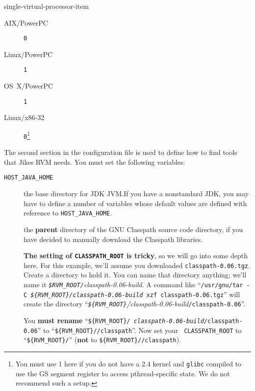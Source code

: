 \begin{enumerate}
\begin{Label}{single-virtual-processor-item}
\begin{description}
\item[AIX/PowerPC] \texttt{0 }
\item[Linux/PowerPC] \texttt{1}
\item[OS~X/PowerPC] \texttt{1}
\item[Linux/x86-32] \texttt{0}\footnote{You must use 1 here if you do not
have a 2.4 kernel and \texttt{glibc} compiled to use the GS segment register to
access pthread-specific state.  We do not recommend such a setup.}
\end{description}                
\end{Label}

The second section in the configuration file is used to define how to
find tools that Jikes RVM needs. You must set the following variables:

\begin{description}

\item[\texttt{HOST\_JAVA\_HOME}] the base directory for JDK JVM.\@  If you
have a nonstandard JDK, you may have to define a number of variables
whose default values are defined with reference to \texttt{HOST\_JAVA\_HOME}.

\label{manual-classpath-root}%
\item[] the {\bf parent} directory of the GNU
  Classpath source code directory, if you have decided to manually
  download the Classpath libraries. 

{\bf The setting of \texttt{CLASSPATH\_ROOT} is tricky}, so we will go
into some depth here.  For this example, we'll assume you downloaded
\texttt{classpath-0.06.tgz}.  Create a directory to hold it.  You can
name that directory anything; we'll name it 
{\it \texttt{\$RVM\_\-ROOT/}classpath-0.06-build}.  
A command like 
``\texttt{/usr/gnu/tar -C
  {\rm \it \texttt{\$\{RVM\_\-ROOT\}/}\-classpath-0.06-build} xzf classpath-0.06.tgz}''
will create the directory
``{\rm \it \texttt{\$\{RVM\_\-ROOT\}}/\-class\-path-0.06-build}\texttt{/\-class\-path-0.06}''.  

You {\bf must rename} ``\texttt{\$\{RVM\_\-ROOT\}/{\it
    class\-path-0.06-build}/\-class\-path-0.06}'' to ``\texttt{\$\{RVM\_\-ROOT\}//\-class\-path}''.  Now set your {\tt
  CLASS\-PATH\_\-ROOT} to ``\texttt{\$\{RVM\_\-ROOT\}/}''
({\bf not} to \texttt{\$\{RVM\_\-ROOT\}//\-class\-path}).



\end{description}
\end{enumerate}
